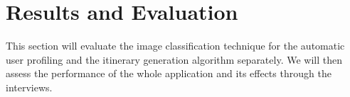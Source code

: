 
\section{Results and Evaluation}
\label{evaluation}

This section will evaluate the image
classification technique for the automatic user profiling and the itinerary
generation algorithm separately. We will then assess the performance of the
whole application and its effects through the interviews.



